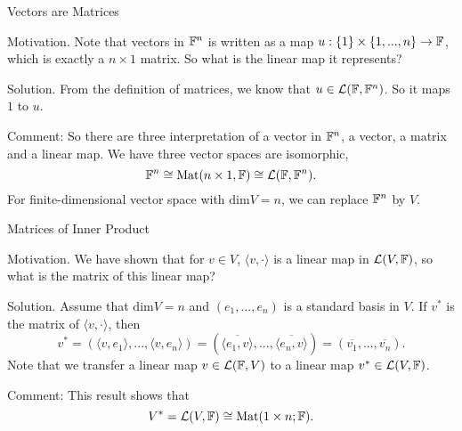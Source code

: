\documentclass[hyperref={pdfpagelabels=true}]{beamer}
\renewcommand{\L}{\mathcal{L}}
\newcommand{\Mat}{\text{Mat}}
\newcommand{\<}{\langle}
\renewcommand{\>}{\rangle}
\begin{document}
\begin{frame}{Vectors are Matrices}
    \begin{block}{Motivation.}
        Note that vectors in $\mathbb{F}^{n}$ is written as a map $u:\{1\} \times \{1,...,n\} \rightarrow \mathbb{F}$, which is exactly a $n \times 1$ matrix. So what is the linear map it represents?
    \end{block}
    \begin{block}{Solution.}
        From the definition of matrices, we know that $u \in \L(\F,\F^{n})$. So it maps $1$ to $u$.
    \end{block}
    \begin{block}{Comment:}
        So there are three interpretation of a vector in $\mathbb{F}^{n}$, a vector, a matrix and a linear map. We have three vector spaces are isomorphic,
        \[\F^{n} \cong \Mat(n \times 1,\F) \cong \L(\F,\F^{n}).\]
        For finite-dimensional vector space with $\text{dim}V = n$, we can replace $\mathbb{F}^{n}$ by $V$.
    \end{block}
\end{frame}
\begin{frame}{Matrices of Inner Product}
    \begin{block}{Motivation.}
        We have shown that for $v \in V$, $\<v,\cdot\>$ is a linear map in $\L(V,\F)$, so what is the matrix of this linear map?
    \end{block}
    \begin{block}{Solution.}
        Assume that $\text{dim}V = n$ and $(e_{1},...,e_{n})$ is a standard basis in $V$. If $v^{*}$ is the matrix of $\<v,\cdot\>$, then 
        \[v^{*} = (\<v,e_{1}\>,...,\<v,e_{n}\>) = (\overline{\<e_{1},v\>},...,\overline{\<e_{n},v\>}) = (\overline{v_{1}},...,\overline{v_{n}}).\]
        Note that we transfer a linear map $v \in \L(\F,V)$ to a linear map $v^{*} \in \L(V,\F)$. 
    \end{block}
    \begin{block}{Comment:}
        This result shows that 
        \[V^{*} = \L(V,\F) \cong \Mat(1 \times n;\F).\]
    \end{block}
\end{frame}
\end{document}
